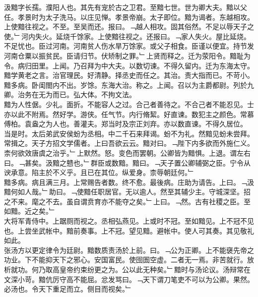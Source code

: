 \documentclass{zhvt-classic}
\begin{document}

\hspace*{2em}汲黯字长孺。濮阳人也。其先有宠於古之卫君。至黯七世。世为卿大夫。黯以父任。孝景时为太子洗马。以庄见惮。孝景帝崩。太子即位。黯为谒者。东越相攻。上使黯往视之。不至。至吴而还。报曰。﹁越人相攻。固其俗然。不足以辱天子之使。﹂河内失火。延烧千馀家。上使黯往视之。还报曰。﹁家人失火。屋比延烧。不足忧也。臣过河南。河南贫人伤水旱万馀家。或父子相食。臣谨以便宜。持节发河南仓粟以振贫民。臣请归节。伏矫制之罪。﹂上贤而释之。迁为荥阳令。黯耻为令。病归田里。上闻。乃召拜为中大夫。以数切谏。不得久留内。迁为东海太守。黯学黄老之言。治官理民。好清静。择丞史而任之。其治。责大指而已。不苛小。黯多病。卧闺閤内不出。岁馀。东海大治。称之。上闻。召以为主爵都尉。列於九卿。治务在无为而已。弘大体。不拘文法。\\
\hspace*{2em}黯为人性倨。少礼。面折。不能容人之过。合己者善待之。不合己者不能忍见。士亦以此不附焉。然好学。游侠。任气节。内行脩絜。好直谏。数犯主之颜色。常慕傅柏。袁盎之为人也。善灌夫。郑当时及宗正刘弃。亦以数直谏。不得久居位。\\
\hspace*{2em}当是时。太后弟武安侯蚡为丞相。中二千石来拜谒。蚡不为礼。然黯见蚡未尝拜。常揖之。天子方招文学儒者。上曰吾欲云云。黯对曰。﹁陛下内多欲而外施仁义。柰何欲效唐虞之治乎。﹂上默然。怒。变色而罢朝。公卿皆为黯惧。上退。谓左右曰。﹁甚矣。汲黯之戆也。﹂群臣或数黯。黯曰。﹁天子置公卿辅弼之臣。宁令从谀承意。陷主於不义乎。且已在其位。纵爱身。柰辱朝廷何。﹂\\
\hspace*{2em}黯多病。病且满三月。上常赐告者数。终不愈。最後病。庄助为请告。上曰。﹁汲黯何如人哉。﹂助曰。﹁使黯任职居官。无以逾人。然至其辅少主。守城深坚。招之不来。麾之不去。虽自谓贲育亦不能夺之矣。﹂上曰。﹁然。古有社稷之臣。至如黯。近之矣。﹂\\
\hspace*{2em}大将军青侍中。上踞厕而视之。丞相弘燕见。上或时不冠。至如黯见。上不冠不见也。上尝坐武帐中。黯前奏事。上不冠。望见黯。避帐中。使人可其奏。其见敬礼如此。\\
\hspace*{2em}张汤方以更定律令为廷尉。黯数质责汤於上前。曰。﹁公为正卿。上不能襃先帝之功业。下不能抑天下之邪心。安国富民。使囹圄空虚。二者无一焉。非苦就行。放析就功。何乃取高皇帝约束纷更之为。公以此无种矣。﹂黯时与汤论议。汤辩常在文深小苛。黯伉厉守高不能屈。忿发骂曰。﹁天下谓刀笔吏不可以为公卿。果然。必汤也。令天下重足而立。侧目而视矣。﹂\\
\end{document}
